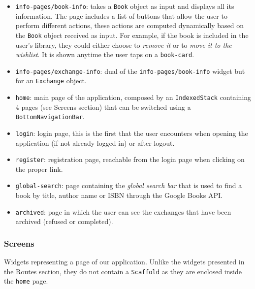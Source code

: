 \begin{itemize}
    \item \texttt{info-pages/book-info}:
          takes a \texttt{Book} object as input and displays all its information.
          The page includes a list of buttons that allow the user to perform different actions, these actions are computed dynamically based on the \texttt{Book} object received as input.
          For example, if the book is included in the user's library, they could either choose to \emph{remove it} or to \emph{move it to the wishlist}.
          It is shown anytime the user taps on a \texttt{book-card}.
    \item \texttt{info-pages/exchange-info}:
          dual of the \texttt{info-pages/book-info} widget but for an \texttt{Exchange} object.
    \item \texttt{home}:
          main page of the application, composed by an \texttt{IndexedStack} containing 4 pages (see Screens section) that can be switched using a \texttt{BottomNavigationBar}.
    \item \texttt{login}:
          login page, this is the first that the user encounters when opening the application (if not already logged in) or after logout.
    \item \texttt{register}:
          registration page, reachable from the login page when clicking on the proper link.
    \item \texttt{global-search}:
          page containing the \emph{global search bar} that is used to find a book by title, author name or ISBN through the Google Books API.
    \item \texttt{archived}:
          page in which the user can see the exchanges that have been archived (refused or completed).
\end{itemize}

\subsubsection{Screens}
Widgets representing a page of our application.
Unlike the widgets presented in the Routes section, they do not contain a \texttt{Scaffold} as they are enclosed inside the \texttt{home} page.

